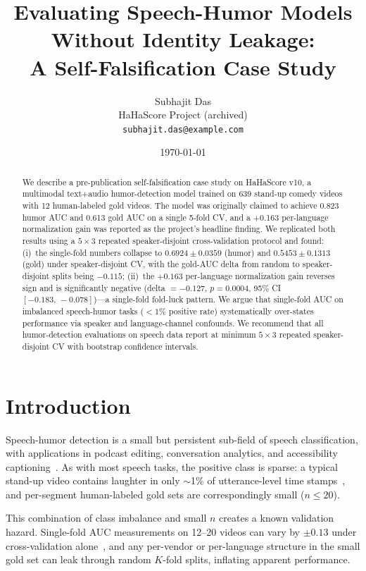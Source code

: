 \documentclass[11pt, letterpaper]{article}
\title{Evaluating Speech-Humor Models Without Identity Leakage:\\
       A Self-Falsification Case Study}
\author{Subhajit Das \\
HaHaScore Project (archived) \\
\texttt{subhajit.das@example.com}}
\date{\today}
\begin{document}
\maketitle

\begin{abstract}
We describe a pre-publication self-falsification case study on HaHaScore v10,
a multimodal text+audio humor-detection model trained on 639 stand-up comedy
videos with 12 human-labeled gold videos. The model was originally claimed to
achieve 0.823 humor AUC and 0.613 gold AUC on a single 5-fold CV, and a +0.163
per-language normalization gain was reported as the project's headline finding.
We replicated both results using a $5\times3$ repeated speaker-disjoint
cross-validation protocol and found: (i)~the single-fold numbers collapse to
$0.6924 \pm 0.0359$ (humor) and $0.5453 \pm 0.1313$ (gold) under
speaker-disjoint CV, with the gold-AUC delta from random to speaker-disjoint
splits being $-0.115$; (ii)~the $+0.163$ per-language normalization gain reverses
sign and is significantly negative (delta $= -0.127$, $p=0.0004$, 95\% CI
$[-0.183,\,-0.078]$)---a single-fold fold-luck pattern. We argue that
single-fold AUC on imbalanced speech-humor tasks ($<1\%$ positive rate)
systematically over-states performance via speaker and language-channel
confounds. We recommend that all humor-detection evaluations on speech data
report at minimum $5\times3$ repeated speaker-disjoint CV with bootstrap
confidence intervals.
\end{abstract}

\section{Introduction}

Speech-humor detection is a small but persistent sub-field of speech
classification, with applications in podcast editing, conversation analytics,
and accessibility captioning~\cite{standup4ai}. As with most speech tasks, the
positive class is sparse: a typical stand-up video contains laughter in only
$\sim$1\% of utterance-level time stamps~\cite{yang-etal-2015-humor}, and
per-segment human-labeled gold sets are correspondingly small ($n \leq 20$).

This combination of class imbalance and small $n$ creates a known validation
hazard. Single-fold AUC measurements on 12--20 videos can vary by $\pm 0.13$
under cross-validation alone~\cite{weller-2020-humor}, and any per-vendor or
per-language structure in the small gold set can leak through random $K$-fold
splits, inflating apparent performance.
\end{document}
